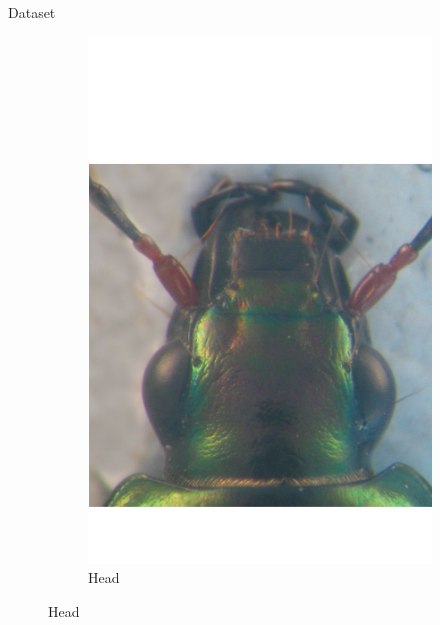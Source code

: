 \documentclass[10pt]{beamer}
\begin{document}
\begin{frame}[c]{Dataset}
\begin{figure}[htbp]
\begin{subfigure}[t]{0.22\textwidth}
        			\includegraphics[scale=.16]{images/tete2}
        			\caption{\footnotesize{Head}}
        			\label{figsub22}
    			\end{subfigure}
			\end{figure}
\end{frame}

\end{document}
